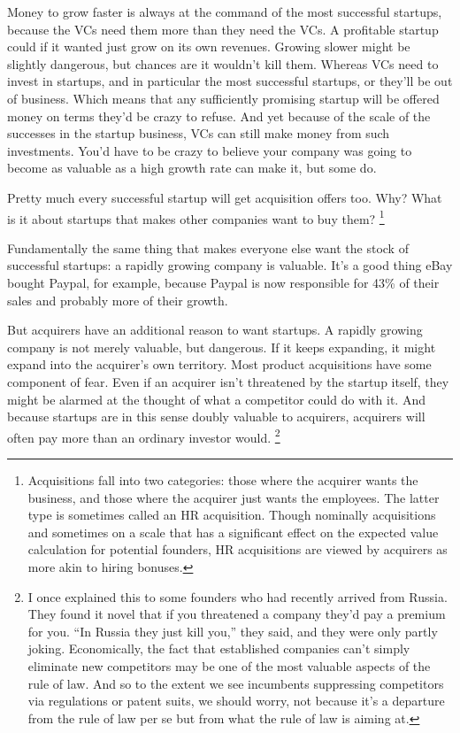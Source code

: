 Money to grow faster is always at the command of the most successful
startups, because the VCs need them more than they need the VCs. A
profitable startup could if it wanted just grow on its own revenues.
Growing slower might be slightly dangerous, but chances are it wouldn't
kill them. Whereas VCs need to invest in startups, and in particular the
most successful startups, or they'll be out of business. Which means
that any sufficiently promising startup will be offered money on terms
they'd be crazy to refuse. And yet because of the scale of the successes
in the startup business, VCs can still make money from such investments.
You'd have to be crazy to believe your company was going to become as
valuable as a high growth rate can make it, but some do.

Pretty much every successful startup will get acquisition offers too.
Why? What is it about startups that makes other companies want to buy
them? \footnote{Acquisitions fall into two categories: those where the acquirer
wants the business, and those where the acquirer just wants the
employees. The latter type is sometimes called an HR acquisition. Though
nominally acquisitions and sometimes on a scale that has a significant
effect on the expected value calculation for potential founders, HR
acquisitions are viewed by acquirers as more akin to hiring bonuses.}

Fundamentally the same thing that makes everyone else want the stock of
successful startups: a rapidly growing company is valuable. It's a good
thing eBay bought Paypal, for example, because Paypal is now responsible
for 43\% of their sales and probably more of their growth.

But acquirers have an additional reason to want startups. A rapidly
growing company is not merely valuable, but dangerous. If it keeps
expanding, it might expand into the acquirer's own territory. Most
product acquisitions have some component of fear. Even if an acquirer
isn't threatened by the startup itself, they might be alarmed at the
thought of what a competitor could do with it. And because startups are
in this sense doubly valuable to acquirers, acquirers will often pay
more than an ordinary investor would. \footnote{I once explained this to some founders who had recently arrived
from Russia. They found it novel that if you threatened a company they'd
pay a premium for you. ``In Russia they just kill you,'' they said, and
they were only partly joking. Economically, the fact that established
companies can't simply eliminate new competitors may be one of the most
valuable aspects of the rule of law. And so to the extent we see
incumbents suppressing competitors via regulations or patent suits, we
should worry, not because it's a departure from the rule of law per se
but from what the rule of law is aiming at.}

